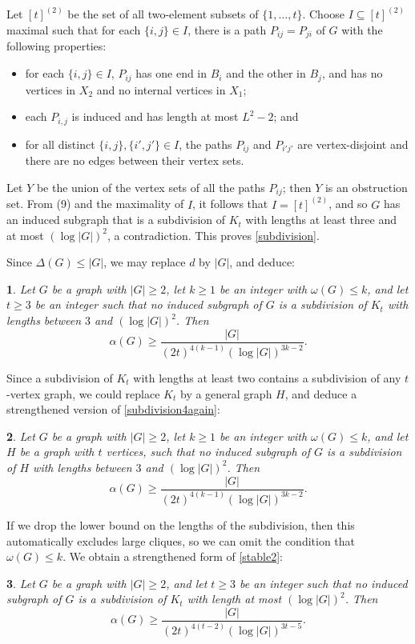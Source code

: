 \documentclass[titlepage,11pt]{article}
\newcommand\blackslug{\hbox{\hskip 1pt \vrule width 4pt height 8pt depth 1.5pt
        \hskip 1pt}}
\newcommand\bbox{\hfill \quad \blackslug \bigbreak}
\def\LL{,\ldots,}
\newtheorem{thm}{}[section]
\begin{document}
\bigskip

Let $[t]^{(2)}$ be the set of all two-element
subsets of $\{1\LL t\}$.
Choose $I\subseteq [t]^{(2)}$ maximal such that for each $\{i,j\}\in I$, there is a path $P_{ij}=P_{ji}$ of $G$ with the following 
properties:
\begin{itemize}
\item for each $\{i,j\}\in I$, $P_{ij}$ has one end in $B_i$ and the other in $B_j$, and has no vertices in $X_2$ and no internal vertices in $X_1$;
\item each $P_{i,j}$ is induced and has length at most $L^2-2$; and
\item for all distinct $\{i,j\},\{i',j'\}\in I$, the paths $P_{ij}$ and $P_{i'j'}$ are vertex-disjoint and there are no edges 
between their vertex sets.
\end{itemize}
Let $Y$ be the union of the vertex sets of all the paths $P_{ij}$; then $Y$ is an obstruction set. From (9) and the maximality of $I$,
it follows that $I=[t]^{(2)}$, and so $G$ has an induced subgraph that is a subdivision of $K_t$ with lengths at least three and 
at most $(\log |G|)^2$, a contradiction.
This proves \ref{subdivision}.~\bbox

Since $\Delta(G)\le |G|$, we may replace $d$ by $|G|$, and deduce:
\begin{thm} \label{subdivision2}
Let $G$ be a graph with $|G|\ge 2$, let $k\ge 1$ be an integer with $\omega(G)\le k$, and let $t\ge 3$ be an integer
such that no induced subgraph of $G$
is a subdivision of $K_t$ with lengths between $3$ and $(\log |G|)^2$.  Then
$$\alpha(G)\ge \frac{|G|}{(2t)^{4(k-1)}(\log |G|)^{3k-2}}.$$
\end{thm}
Since a subdivision of $K_t$ with lengths at least two contains a subdivision of any $t$-vertex graph, we could replace $K_t$ by a general graph $H$, and deduce a strengthened version of \ref{subdivision4again}:
\begin{thm} \label{subdivision4}
Let $G$ be a graph with $|G|\ge 2$, let $k\ge 1$ be an integer with $\omega(G)\le k$, and let $H$ be a graph with $t$ vertices, 
such that no induced subgraph of $G$
is a subdivision of $H$ with lengths between $3$ and $(\log |G|)^2$.  Then
$$\alpha(G)\ge \frac{|G|}{(2t)^{4(k-1)}(\log |G|)^{3k-2}}.$$
\end{thm}
If we drop the lower bound on the lengths of the subdivision, then this automatically excludes large cliques, so we can omit the condition that $\omega(G)\le k$. We obtain
a strengthened form of \ref{stable2}:
\begin{thm} \label{subdivision3}
Let $G$ be a graph with $|G|\ge 2$, and let $t\ge 3$ be an integer
such that no induced subgraph of $G$
is a subdivision of $K_t$ with length at most  $(\log |G|)^2$.  Then
$$\alpha(G)\ge \frac{|G|}{(2t)^{4(t-2)}(\log |G|)^{3t-5}}.$$
\end{thm}
\end{document}
